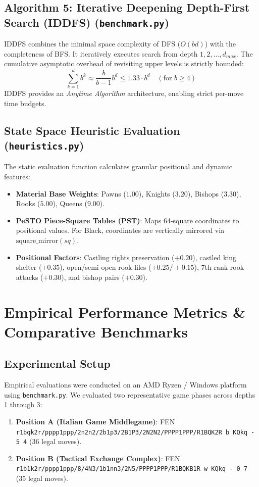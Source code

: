 \documentclass[11pt,a4paper]{article}
\begin{document}
\subsection{Algorithm 5: Iterative Deepening Depth-First Search (IDDFS) (\texttt{benchmark.py})}
IDDFS combines the minimal space complexity of DFS ($O(bd)$) with the completeness of BFS. It iteratively executes search from depth $1, 2, \dots, d_{max}$. The cumulative asymptotic overhead of revisiting upper levels is strictly bounded:
$$\sum_{k=1}^{d} b^k \approx \frac{b}{b-1} b^d \le 1.33 \cdot b^d \quad (\text{for } b \ge 4)$$
IDDFS provides an \textit{Anytime Algorithm} architecture, enabling strict per-move time budgets.

\subsection{State Space Heuristic Evaluation (\texttt{heuristics.py})}
The static evaluation function calculates granular positional and dynamic features:
\begin{itemize}[leftmargin=*]
    \item \textbf{Material Base Weights}: Pawns ($1.00$), Knights ($3.20$), Bishops ($3.30$), Rooks ($5.00$), Queens ($9.00$).
    \item \textbf{PeSTO Piece-Square Tables (PST)}: Maps 64-square coordinates to positional values. For Black, coordinates are vertically mirrored via $\text{square\_mirror}(sq)$.
    \item \textbf{Positional Factors}: Castling rights preservation ($+0.20$), castled king shelter ($+0.35$), open/semi-open rook files ($+0.25 / +0.15$), 7th-rank rook attacks ($+0.30$), and bishop pairs ($+0.30$).
\end{itemize}

\section{Empirical Performance Metrics \& Comparative Benchmarks}

\subsection{Experimental Setup}
Empirical evaluations were conducted on an AMD Ryzen / Windows platform using \texttt{benchmark.py}. We evaluated two representative game phases across depths 1 through 3:
\begin{enumerate}
    \item \textbf{Position A (Italian Game Middlegame)}: FEN \texttt{r1bqk2r/pppp1ppp/2n2n2/2b1p3/2B1P3/2N2N2/PPPP1PPP/R1BQK2R b KQkq - 5 4} (36 legal moves).
    \item \textbf{Position B (Tactical Exchange Complex)}: FEN \texttt{r1b1k2r/pppp1ppp/8/4N3/1b1nn3/2N5/PPPP1PPP/R1BQKB1R w KQkq - 0 7} (35 legal moves).
\end{enumerate}
\end{document}
